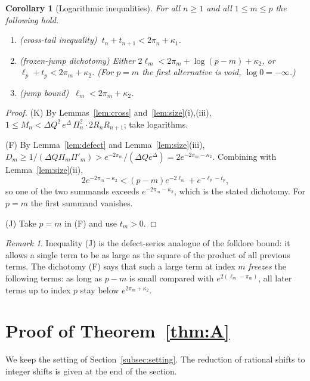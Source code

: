 \documentclass[11pt]{amsart}
\newtheorem{corollary}[lemma]{Corollary}
\theoremstyle{definition}
\theoremstyle{remark}
\newtheorem{remark}[lemma]{Remark}
\begin{document}
\begin{corollary}[Logarithmic inequalities]\label{cor:log}
For all $n\ge 1$ and all $1\le m\le p$ the following hold.
\begin{enumerate}[label=\textup{(\Alph*)}]
\item[\textup{(K)}] \emph{(cross-tail inequality)} $\ t_n+t_{n+1}<2\pi_n+\kappa_1$.
\item[\textup{(F)}] \emph{(frozen-jump dichotomy)} Either
$2\ell_m<2\pi_m+\log(p-m)+\kappa_2$, or $\ell_p+t_p<2\pi_m+\kappa_2$.
\textup{(}For $p=m$ the first alternative is void, $\log 0=-\infty$.\textup{)}
\item[\textup{(J)}] \emph{(jump bound)} $\ \ell_m<2\pi_m+\kappa_2$.
\end{enumerate}
\end{corollary}

\begin{proof}
(K) By Lemmas~\ref{lem:cross} and~\ref{lem:size}(i),(iii),
$1\le M_n<\Delta Q^2\,e^{\Delta}\,\Pi_n^2\cdot2R_nR_{n+1}$; take logarithms.

(F) By Lemma~\ref{lem:defect} and Lemma~\ref{lem:size}(iii),
$D_m\ge 1/(\Delta Q\Pi_m\Pi'_m)>e^{-2\pi_m}/(\Delta Qe^{\Delta})=2e^{-2\pi_m-\kappa_2}$.
Combining with Lemma~\ref{lem:size}(ii),
\[
2e^{-2\pi_m-\kappa_2}<(p-m)e^{-2\ell_m}+e^{-\ell_p-t_p},
\]
so one of the two summands exceeds $e^{-2\pi_m-\kappa_2}$, which is the stated
dichotomy. For $p=m$ the first summand vanishes.

(J) Take $p=m$ in (F) and use $t_m>0$.
\end{proof}

\begin{remark}
Inequality (J) is the defect-series analogue of the folklore bound: it allows a
single term to be as large as the square of the product of all previous terms. The
dichotomy (F) says that such a large term at index $m$ \emph{freezes} the following
terms: as long as $p-m$ is small compared with $e^{2(\ell_m-\pi_m)}$, all later terms
up to index $p$ stay below $e^{2\pi_m+\kappa_2}$.
\end{remark}

\section{Proof of Theorem~\ref{thm:A}}\label{sec:A}

We keep the setting of Section~\ref{subsec:setting}. The reduction of rational shifts
to integer shifts is given at the end of the section.
\end{document}
